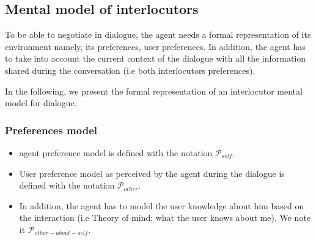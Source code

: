 \documentclass{llncs}
\begin{document}


 \subsection{Mental model of interlocutors}
 
 
% 
 
% 
 
 
 To be able to negotiate in dialogue, the agent  needs a formal representation of its environment namely, its preferences,  user preferences. In addition, the agent has to take into account the current context of the dialogue with all the information shared during the conversation (i.e both interlocutors preferences). 
 
 In the following, we present the formal representation of an interlocutor mental model for dialogue.  
 
 \subsubsection{Preferences model}
 
 \begin{itemize}
 	\item agent preference model is defined with the notation $\mathcal{P}_{self}$.
 	\item User preference model as perceived by the agent during the dialogue is  defined with the notation $\mathcal{P}_{other}$.
 	\item In addition, the agent has to model  the user  knowledge about him based on the interaction (i.e Theory of mind; what the user knows about me). We note it   $\mathcal{P}_{other-about-self}$.
 \end{itemize}
\end{document}
